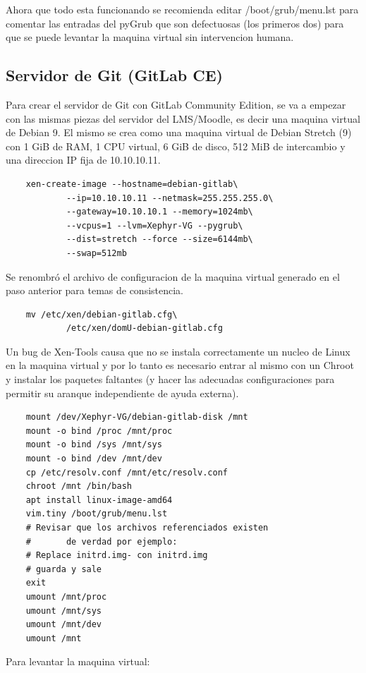 Ahora que todo esta funcionando se recomienda editar /boot/grub/menu.lst para comentar las entradas del pyGrub que son defectuosas (los primeros dos) para que se puede levantar la maquina virtual sin intervencion humana.

\subsection{Servidor de Git (GitLab CE)}
Para crear el servidor de Git con GitLab Community Edition, se va a empezar con las mismas piezas del servidor del LMS/Moodle, es decir una maquina virtual de Debian 9. El mismo se crea como una maquina virtual de Debian Stretch (9) con 1 GiB de RAM, 1 CPU virtual, 6 GiB de disco, 512 MiB de intercambio y una direccion IP fija de 10.10.10.11.
\begin{lstlisting}
	xen-create-image --hostname=debian-gitlab\
    		--ip=10.10.10.11 --netmask=255.255.255.0\
        	--gateway=10.10.10.1 --memory=1024mb\
        	--vcpus=1 --lvm=Xephyr-VG --pygrub\
        	--dist=stretch --force --size=6144mb\
        	--swap=512mb
\end{lstlisting}

Se renombró el archivo de configuracion de la maquina virtual generado en el paso anterior para temas de consistencia.

\begin{lstlisting}
	mv /etc/xen/debian-gitlab.cfg\
    		/etc/xen/domU-debian-gitlab.cfg
\end{lstlisting}

Un bug de Xen-Tools causa que no se instala correctamente un nucleo de Linux en la maquina virtual y por lo tanto es necesario entrar al mismo con un Chroot y instalar los paquetes faltantes (y hacer las adecuadas configuraciones  para permitir su aranque independiente de ayuda externa).

\begin{lstlisting}
	mount /dev/Xephyr-VG/debian-gitlab-disk /mnt
	mount -o bind /proc /mnt/proc
	mount -o bind /sys /mnt/sys
	mount -o bind /dev /mnt/dev
	cp /etc/resolv.conf /mnt/etc/resolv.conf
	chroot /mnt /bin/bash
	apt install linux-image-amd64
	vim.tiny /boot/grub/menu.lst
	# Revisar que los archivos referenciados existen
	#		de verdad por ejemplo:
	# Replace initrd.img- con initrd.img
    # guarda y sale
	exit
	umount /mnt/proc            
	umount /mnt/sys 
	umount /mnt/dev 
	umount /mnt	
\end{lstlisting}

Para levantar la maquina virtual:

